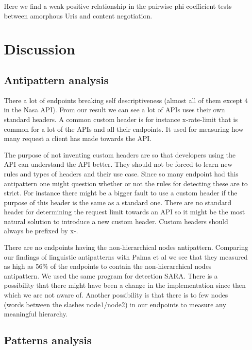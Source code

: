 \documentclass[a4paper,12pt]{article}
\begin{document}
Here we find a weak positive relationship in the pairwise phi coefficient tests between amorphous Uris and content negotiation.

\newpage
	
\section{Discussion}

\subsection{Antipattern analysis}

There a lot of endpoints breaking self descriptiveness (almost all of them except 4 in the Nasa API). From our result we can see a lot of APIs uses their own standard headers. A common custom header is for instance x-rate-limit that is common for a lot of the APIs and all their endpoints. It used for measuring how many request a client has made towards the API. 

The purpose of not inventing custom headers are so that developers using the API can understand the API better. They should not be forced to learn new rules and types of headers and their use case. Since so many endpoint had this antipattern one might question whether or not the rules for detecting these are to strict. For instance there might be a bigger fault to use a custom header if the purpose of this header is the same as a standard one. There are no standard header for determining the request limit towards an API so it might be the most natural solution to introduce a new custom header. Custom headers should always be prefixed by x-. 

There are no endpoints having the non-hierarchical nodes antipattern. Comparing our findings of linguistic antipatterns with Palma et al \cite{linguistic} we see that they measured as high as 56\% of the endpoints to contain the non-hierarchical nodes antipattern. We used the same program for detection SARA. There is a possibility that there might have been a change in the implementation since then which we are not aware of. Another possibility is that there is to few nodes (words between the slashes node1/node2) in our endpoints to measure any meaningful hierarchy.

\subsection{Patterns analysis}
\end{document}
